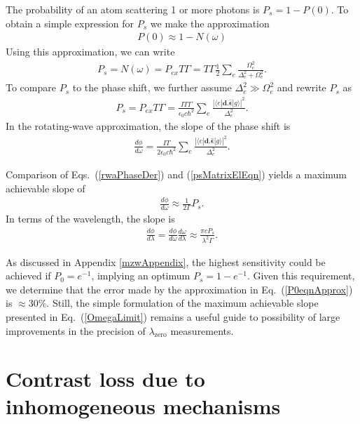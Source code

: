 The probability of an atom scattering 1 or more photons is $P_s=1-P(0)$. To obtain a simple expression for $P_s$ we make the approximation
\begin{eqnarray}
\label{P0eqnApprox}
P(0) \approx 1-N(\omega)
\end{eqnarray}
Using this approximation, we can write
\begin{eqnarray}
\label{psEqn}
P_s = N(\omega) = P_{ex}T\Gamma = T\Gamma \frac{1}{2} \sum_e \frac{\Omega_e^2}{\Delta_e^2+\Omega_e^2}.
\end{eqnarray}
To compare $P_s$ to the phase shift, we further assume $\Delta_e^2 \gg \Omega_e^2$ and rewrite $P_s$ as
\begin{eqnarray}
\label{psMatrixElEqn}
P_s = P_{ex}T\Gamma = \frac{I T\Gamma}{\epsilon_0 c \hbar^2} \sum_e \frac{|\langle e | \bm{d} . \bm{\hat{\epsilon}} | g \rangle |^2}{\Delta_e^2}.
\end{eqnarray}
In the rotating-wave approximation, the slope of the phase shift is
\begin{eqnarray}
\label{rwaPhaseDer}
\frac{d\phi}{d\omega}=\frac{IT}{2\epsilon_0c\hbar^2} \sum_e \frac{|\langle e | \bm{d} . \bm{\hat{\epsilon}} | g \rangle | ^2}{\Delta_e^2}.
\end{eqnarray}

Comparison of Eqs.~(\ref{rwaPhaseDer}) and (\ref{psMatrixElEqn}) yields a maximum achievable slope of
\begin{eqnarray}
\label{OmegaLimit}
\frac{d\phi}{d\omega}\approx\frac{1}{2\Gamma}P_s.
\end{eqnarray}
In terms of the wavelength, the slope is
\begin{eqnarray}
\label{LambdaLimit}
\frac{d\phi}{d\lambda}=\frac{d\phi}{d\omega}\frac{d\omega}{d\lambda}\approx\frac{\pi c P_s}{\lambda^2\Gamma}.
\end{eqnarray}

As discussed in Appendix \ref{mzwAppendix}, the highest sensitivity could be achieved if $P_0=e^{-1}$, implying an optimum $P_s=1-e^{-1}$. Given this requirement, we determine that the error made by the approximation in Eq.~(\ref{P0eqnApprox}) is $\approx30\%$. Still, the simple formulation of the maximum achievable slope presented in Eq.~(\ref{OmegaLimit}) remains a useful guide to possibility of large improvements in the precision of $\lambda_\textrm{zero}$ measurements. 




\section{Contrast loss due to inhomogeneous mechanisms}
\label{mzwContrast}

